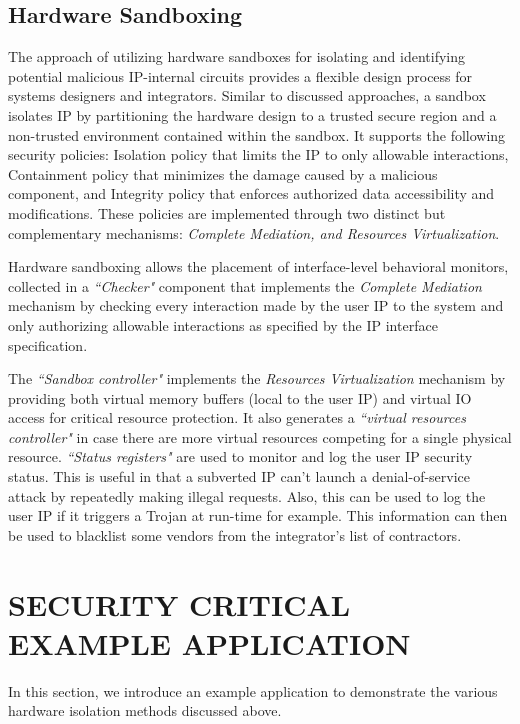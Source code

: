 \documentclass[sigconf]{acmart}
\theoremstyle{plain}
\theoremstyle{remark}
\begin{document}
\subsection{Hardware Sandboxing}\label{sec:HardwareSandbox}
The approach of utilizing hardware sandboxes for isolating and identifying potential malicious IP-internal circuits provides a flexible design process for systems designers and integrators. Similar to discussed approaches, a sandbox isolates IP by partitioning the hardware design to a trusted secure region and a non-trusted environment contained within the sandbox. It supports the following security policies: Isolation policy that limits the IP to only allowable interactions, Containment policy that minimizes the damage caused by a malicious component, and Integrity policy that enforces authorized data accessibility and modifications. These policies are implemented through two distinct but complementary mechanisms: \textit{ Complete Mediation, and  Resources Virtualization}.

Hardware sandboxing allows the placement of interface-level behavioral monitors, collected in a \textit{``Checker"} component that implements the \textit{Complete Mediation} mechanism by checking every interaction made by the user IP to the system and only authorizing allowable interactions as specified by the IP interface specification.

The \textit{``Sandbox controller"} implements the \textit{Resources Virtualization} mechanism by providing both virtual memory buffers (local to the user IP) and virtual IO access for critical resource protection. It also generates a \textit{``virtual resources controller"} in case there are more virtual resources competing for a single physical resource. \textit{``Status registers"} are used to monitor and log the user IP security status. This is useful in that a subverted IP can't launch a denial-of-service attack by repeatedly making illegal requests. Also, this can be used to log the user IP if it triggers a Trojan at run-time for example. This information can then be used to blacklist some vendors from the integrator's list of contractors.




\section{SECURITY CRITICAL EXAMPLE APPLICATION} \label{sec:application}

In this section, we introduce an example application to demonstrate the various hardware isolation methods discussed above.
\end{document}
